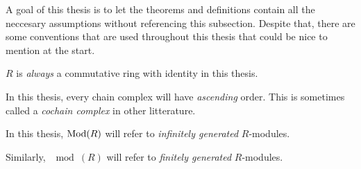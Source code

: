 A goal of this thesis is to let the theorems and definitions contain all the neccesary assumptions without referencing this subsection. Despite that, there are some conventions that are used throughout this thesis that could be nice to mention at the start.

\begin{notation}
    \( R \) is \emph{always} a commutative ring with identity in this thesis.
\end{notation}

\begin{notation}
    In this thesis, every chain complex will have \emph{ascending} order. This is sometimes called a \emph{cochain complex} in other litterature.
\end{notation}

\begin{notation}
    In this thesis, \( \operatorname{Mod}(R) \) will refer to \emph{infinitely generated} \( R \)-modules.

    Similarly, \( \mod(R) \) will refer to \emph{finitely generated} \( R \)-modules.
\end{notation}